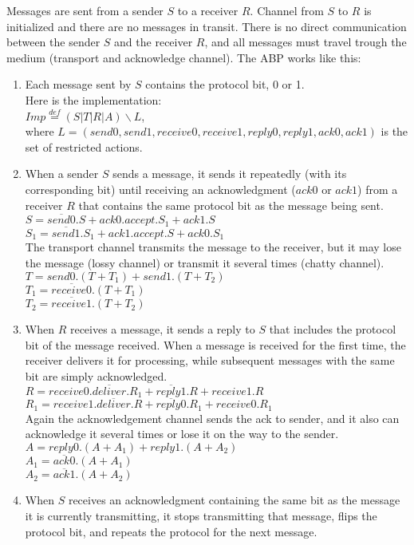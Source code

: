 Messages are sent from a sender $S$ to a receiver $R$. Channel from $S$ to $R$ is initialized and there are no messages in transit. There is no direct communication between the sender $S$ and the receiver $R$, and all messages must travel trough the medium (transport and acknowledge channel). The ABP works like this:
\begin{enumerate}
	\item Each message sent by $S$ contains the protocol bit, 0 or 1.\\
	      Here is the implementation:\\
	      $Imp \stackrel{def}{=}\left(S|T|R|A\right)\backslash L$, \\
	      where $L = \left(send0,send1,receive0,receive1,reply0,reply1,ack0,ack1\right)$ is the set of restricted actions.
	\item When a sender $S$ sends a message, it sends it repeatedly (with its corresponding bit) until receiving an acknowledgment ($ack0$ or $ack1$) from a receiver $R$ that contains the same protocol bit as the message being sent.\\
	      $S=\overline{send0}.S+ack0.accept.S_{1}+ack1.S$\\
	      $S_{1}=\overline{send1}.S_{1}+ack1.accept.S+ack0.S_{1}$\\
	      The transport channel transmits the message to the receiver, but it may lose the message (lossy channel) or transmit it several times (chatty channel).
	      $T=send0.\left(T+T_{1}\right)+send1.\left(T+T_{2}\right)$\\
	      $T_{1}=\overline{receive0}.\left(T+T_{1}\right)$\\
	      $T_{2}=\overline{receive1}.\left(T+T_{2}\right)$
  \item When $R$ receives a message, it sends a reply to $S$ that includes the protocol bit of the message received. When a message is received for the first time, the receiver delivers it for processing, while subsequent messages with the same bit are simply acknowledged.
        $R=receive0.\overline{deliver}.R_{1}+\overline{reply1}.R+receive1.R$\\
        $R_{1}=receive1.\overline{deliver}.R+\overline{reply0}.R_{1}+receive0.R_{1}$\\
        Again the acknowledgement channel sends the ack to sender, and it also can acknowledge it several times or lose it on the way to the sender.\\
        $A=reply0.\left(A+A_{1}\right)+reply1.\left(A+A_{2}\right)$\\
        $A_{1}=\overline{ack0}.\left(A+A_{1}\right)$\\
        $A_{2}=\overline{ack1}.\left(A+A_{2}\right)$
  \item When $S$ receives an acknowledgment containing the same bit as the message it is currently transmitting, it stops transmitting that message, flips the protocol bit, and repeats the protocol for the next message.\cite{Kulick}\cite{ProcessAlgebraParallel}
\end{enumerate}

